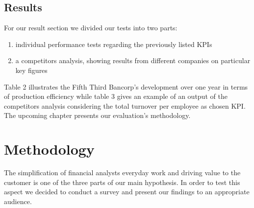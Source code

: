 \documentclass[runningheads]{llncs}
\begin{document}
\subsection{Results}
For our result section we divided our tests into two parts:
\begin{enumerate}
\item individual performance tests regarding the previously listed KPIs
\item a competitors analysis, showing results from different companies on particular key figures
\end{enumerate}
Table 2 illustrates the Fifth Third Bancorp's development over one year in terms of production efficiency while table 3 gives an example of an output of the competitors analysis considering the total turnover per employee as chosen KPI. \\
The upcoming chapter presents our evaluation's methodology. 

\section{Methodology}
The simplification of financial analysts everyday work and driving value to the customer is one of the three parts of our main hypothesis. In order to test this aspect we decided to conduct a survey and present our findings to an appropriate audience.
\end{document}
